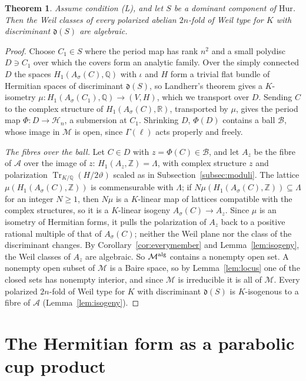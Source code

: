 \documentclass[11pt]{amsart}
\newtheorem{theorem}{Theorem}[section]
\theoremstyle{definition}
\theoremstyle{remark}
\newcommand{\Q}{\mathbb Q}
\newcommand{\Z}{\mathbb Z}
\newcommand{\R}{\mathbb R}
\newcommand{\Tr}{\operatorname{Tr}}
\newcommand{\cH}{\mathrm{Hur}}
\newcommand{\cHn}{\mathcal H_n}
\newcommand{\cM}{\mathcal M}
\newcommand{\fd}{\mathfrak d}
\begin{document}
\begin{theorem}\label{thm:transfer}
Assume condition (L), and let $S$ be a dominant component of $\cH$. Then the Weil classes of every polarized abelian $2n$-fold of Weil type for $K$ with discriminant $\fd(S)$ are algebraic.
\end{theorem}

\begin{proof}
Choose $C_1\in S$ where the period map has rank $n^2$ and a small polydisc $D\ni C_1$ over which the covers form an analytic family. Over the simply connected $D$ the spaces $H_1(A_\sigma(C),\Q)$ with $\iota$ and $H$ form a trivial flat bundle of Hermitian spaces of discriminant $\fd(S)$, so Landherr's theorem gives a $K$-isometry $\mu\colon H_1(A_\sigma(C_1),\Q)\to(V,H)$, which we transport over $D$. Sending $C$ to the complex structure of $H_1(A_\sigma(C),\R)$, transported by $\mu$, gives the period map $\Phi\colon D\to\cHn$, a submersion at $C_1$. Shrinking $D$, $\Phi(D)$ contains a ball $\mathcal B$, whose image in $\cM$ is open, since $\Gamma(\ell)$ acts properly and freely.

\emph{The fibres over the ball.} Let $C\in D$ with $z=\Phi(C)\in\mathcal B$, and let $A_z$ be the fibre of $\mathcal A$ over the image of $z$: $H_1(A_z,\Z)=\Lambda$, with complex structure $z$ and polarization $\Tr_{K/\Q}(H/2\vartheta)$ scaled as in Subsection~\ref{subsec:moduli}. The lattice $\mu(H_1(A_\sigma(C),\Z))$ is commensurable with $\Lambda$; if $N\mu(H_1(A_\sigma(C),\Z))\subseteq\Lambda$ for an integer $N\ge1$, then $N\mu$ is a $K$-linear map of lattices compatible with the complex structures, so it is a $K$-linear isogeny $A_\sigma(C)\to A_z$. Since $\mu$ is an isometry of Hermitian forms, it pulls the polarization of $A_z$ back to a positive rational multiple of that of $A_\sigma(C)$; neither the Weil plane nor the class of the discriminant changes. By Corollary~\ref{cor:everymember} and Lemma~\ref{lem:isogeny}, the Weil classes of $A_z$ are algebraic. So $\cM^{\rm alg}$ contains a nonempty open set. A nonempty open subset of $\cM$ is a Baire space, so by Lemma~\ref{lem:locus} one of the closed sets has nonempty interior, and since $\cM$ is irreducible it is all of $\cM$. Every polarized $2n$-fold of Weil type for $K$ with discriminant $\fd(S)$ is $K$-isogenous to a fibre of $\mathcal A$ (Lemma~\ref{lem:isogeny}).
\end{proof}

\section{The Hermitian form as a parabolic cup product}\label{sec:herm}
\end{document}
